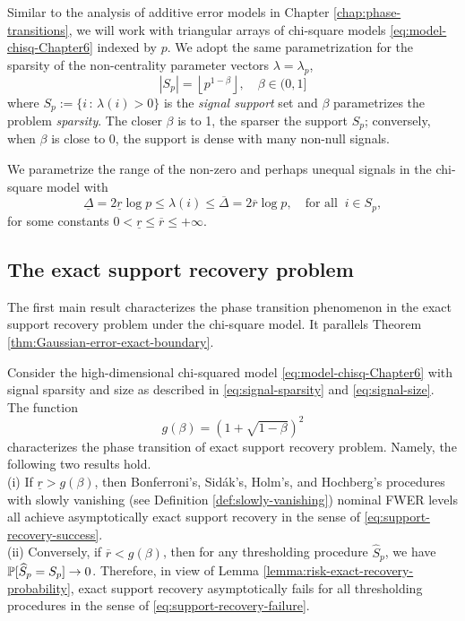 
Similar to the analysis of additive error models in Chapter \ref{chap:phase-transitions}, we will work with triangular arrays of chi-square models \eqref{eq:model-chisq-Chapter6} indexed by $p$.
We adopt the same parametrization for the sparsity of the non-centrality parameter vectors $\lambda = \lambda_p$,
\begin{equation} \label{eq:signal-sparsity}
    |S_p| = \left\lfloor p^{1-\beta} \right\rfloor, \quad \beta\in(0,1]
\end{equation}
where $S_p:= \{ i\, :\, \lambda(i) >0 \}$ is the {\em signal support} set and  $\beta$ parametrizes the problem {\em sparsity}.
The closer $\beta$ is to 1, the sparser the support $S_p$; conversely, when $\beta$ is close to 0, the support is dense with many non-null signals.

We parametrize the range of the non-zero and perhaps unequal signals in the chi-square model with
\begin{equation} \label{eq:signal-size}
    \underline{\Delta} = 2\underline{r}\log{p}
    \le \lambda(i) \le
    \overline{\Delta} = 2\overline{r}\log{p}, \quad \text{for all}\;\;i\in S_p,
\end{equation}
for some constants $0<\underline{r}\le\overline{r}\le+\infty$.

\subsection{The exact support recovery problem}
\label{subsec:exact-support-recovery-chisq}

The first main result characterizes the phase transition phenomenon in the exact support recovery problem under the chi-square model.  It parallels
Theorem \ref{thm:Gaussian-error-exact-boundary}.

\begin{theorem} \label{thm:chi-squared-exact-boundary}
Consider the high-dimensional chi-squared model \eqref{eq:model-chisq-Chapter6} with signal sparsity and size as described in \eqref{eq:signal-sparsity} and \eqref{eq:signal-size}.
The function 
\begin{equation} \label{eq:exact-boundary-chisquared}
    g(\beta) = \left(1 + \sqrt{1-\beta}\right)^2
\end{equation}
characterizes the phase transition of exact support recovery problem.
Namely, the following two results hold.\\

{\rm (i)} If $\underline{r} > {{g}}(\beta)$, then Bonferroni's, Sid\'ak's, Holm's, and Hochberg's procedures with slowly vanishing (see Definition \ref{def:slowly-vanishing}) nominal FWER levels all achieve asymptotically exact support recovery in the sense of \eqref{eq:support-recovery-success}.\\

{\rm (ii)} Conversely, if $\overline{r} < {{g}}(\beta)$, then for any thresholding procedure $\widehat{S}_p$, we have $\P[\widehat{S}_p=S_p]\to0$.
Therefore, in view of Lemma \ref{lemma:risk-exact-recovery-probability}, exact support recovery asymptotically fails for all thresholding procedures in the sense of \eqref{eq:support-recovery-failure}.
\end{theorem}

